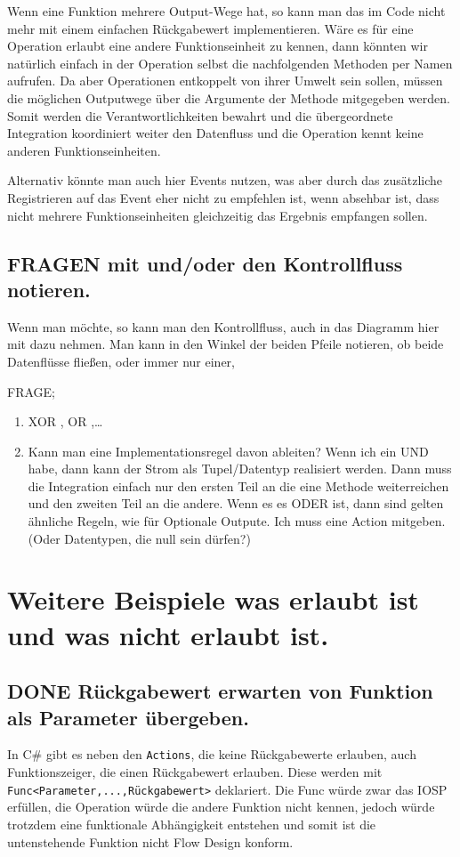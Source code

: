 \documentclass[a4paper,12pt,oneside]{book}
\begin{document}
Wenn eine Funktion mehrere Output-Wege hat, so kann man das im Code nicht mehr mit einem einfachen Rückgabewert implementieren.
Wäre es für eine Operation erlaubt eine andere Funktionseinheit zu kennen, dann könnten wir natürlich einfach in der Operation selbst
die nachfolgenden Methoden per Namen aufrufen. Da aber Operationen entkoppelt von ihrer Umwelt sein sollen, müssen die möglichen
Outputwege über die Argumente der Methode mitgegeben werden. Somit werden die Verantwortlichkeiten bewahrt und die übergeordnete
Integration koordiniert weiter den Datenfluss und die Operation kennt keine anderen Funktionseinheiten.

Alternativ könnte man auch hier Events nutzen, was aber durch das zusätzliche
Registrieren auf das Event eher nicht zu empfehlen ist, wenn absehbar ist, dass
nicht mehrere Funktionseinheiten gleichzeitig das Ergebnis empfangen sollen.

\subsection{FRAGEN mit und/oder den Kontrollfluss notieren.}
\label{sec-4-4-3}
Wenn man möchte, so kann man den Kontrollfluss, auch in das Diagramm hier mit
dazu nehmen. Man kann in den Winkel der beiden Pfeile notieren, ob beide
Datenflüsse fließen, oder immer nur einer,

FRAGE;
\begin{enumerate}
\item XOR , OR ,\ldots{}
\item Kann man eine Implementationsregel davon ableiten?
Wenn ich ein UND habe, dann kann der Strom als Tupel/Datentyp realisiert
werden. Dann muss die Integration einfach nur den ersten Teil an die eine
Methode weiterreichen und den zweiten Teil an die andere.
Wenn es es ODER ist, dann sind gelten ähnliche Regeln, wie für Optionale
Outpute.
Ich muss eine Action mitgeben. (Oder Datentypen, die null sein dürfen?)
\end{enumerate}

\section{Weitere Beispiele was erlaubt ist und was nicht erlaubt ist.}
\label{sec-4-5}
\subsection{{\bfseries\sffamily DONE} Rückgabewert erwarten von Funktion als Parameter übergeben.}
\label{sec-4-5-1}
In C\# gibt es neben den \texttt{Actions}, die keine Rückgabewerte erlauben, auch Funktionszeiger, die einen Rückgabewert erlauben.
Diese werden mit \texttt{Func<Parameter,...,Rückgabewert>} deklariert.
Die Func würde zwar das IOSP erfüllen, die Operation würde die andere Funktion nicht kennen,
jedoch würde trotzdem eine funktionale Abhängigkeit entstehen und somit ist die untenstehende Funktion nicht Flow Design konform.
\end{document}
